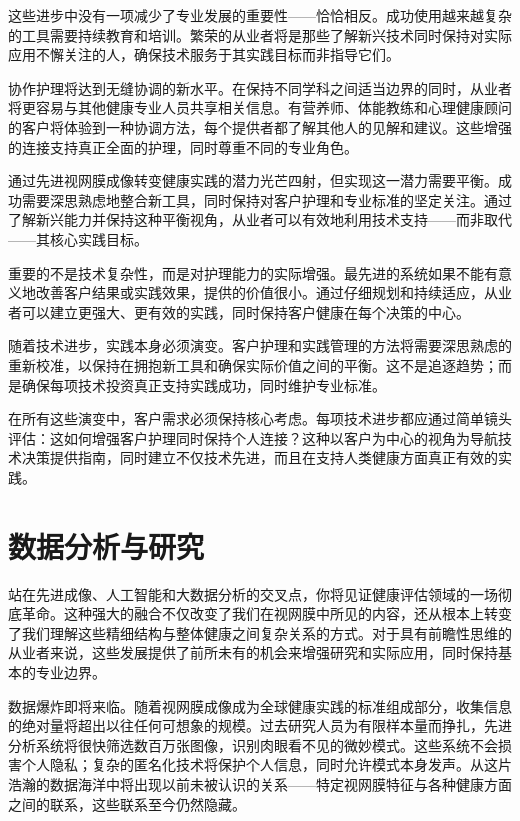 \documentclass[
  Letterpaper,
]{scrbook}
\begin{document}
这些进步中没有一项减少了专业发展的重要性------恰恰相反。成功使用越来越复杂的工具需要持续教育和培训。繁荣的从业者将是那些了解新兴技术同时保持对实际应用不懈关注的人，确保技术服务于其实践目标而非指导它们。

协作护理将达到无缝协调的新水平。在保持不同学科之间适当边界的同时，从业者将更容易与其他健康专业人员共享相关信息。有营养师、体能教练和心理健康顾问的客户将体验到一种协调方法，每个提供者都了解其他人的见解和建议。这些增强的连接支持真正全面的护理，同时尊重不同的专业角色。

通过先进视网膜成像转变健康实践的潜力光芒四射，但实现这一潜力需要平衡。成功需要深思熟虑地整合新工具，同时保持对客户护理和专业标准的坚定关注。通过了解新兴能力并保持这种平衡视角，从业者可以有效地利用技术支持------而非取代------其核心实践目标。

重要的不是技术复杂性，而是对护理能力的实际增强。最先进的系统如果不能有意义地改善客户结果或实践效果，提供的价值很小。通过仔细规划和持续适应，从业者可以建立更强大、更有效的实践，同时保持客户健康在每个决策的中心。

随着技术进步，实践本身必须演变。客户护理和实践管理的方法将需要深思熟虑的重新校准，以保持在拥抱新工具和确保实际价值之间的平衡。这不是追逐趋势；而是确保每项技术投资真正支持实践成功，同时维护专业标准。

在所有这些演变中，客户需求必须保持核心考虑。每项技术进步都应通过简单镜头评估：这如何增强客户护理同时保持个人连接？这种以客户为中心的视角为导航技术决策提供指南，同时建立不仅技术先进，而且在支持人类健康方面真正有效的实践。

\section{数据分析与研究}\label{ux6570ux636eux5206ux6790ux4e0eux7814ux7a76}

站在先进成像、人工智能和大数据分析的交叉点，你将见证健康评估领域的一场彻底革命。这种强大的融合不仅改变了我们在视网膜中所见的内容，还从根本上转变了我们理解这些精细结构与整体健康之间复杂关系的方式。对于具有前瞻性思维的从业者来说，这些发展提供了前所未有的机会来增强研究和实际应用，同时保持基本的专业边界。

数据爆炸即将来临。随着视网膜成像成为全球健康实践的标准组成部分，收集信息的绝对量将超出以往任何可想象的规模。过去研究人员为有限样本量而挣扎，先进分析系统将很快筛选数百万张图像，识别肉眼看不见的微妙模式。这些系统不会损害个人隐私；复杂的匿名化技术将保护个人信息，同时允许模式本身发声。从这片浩瀚的数据海洋中将出现以前未被认识的关系------特定视网膜特征与各种健康方面之间的联系，这些联系至今仍然隐藏。
\end{document}
